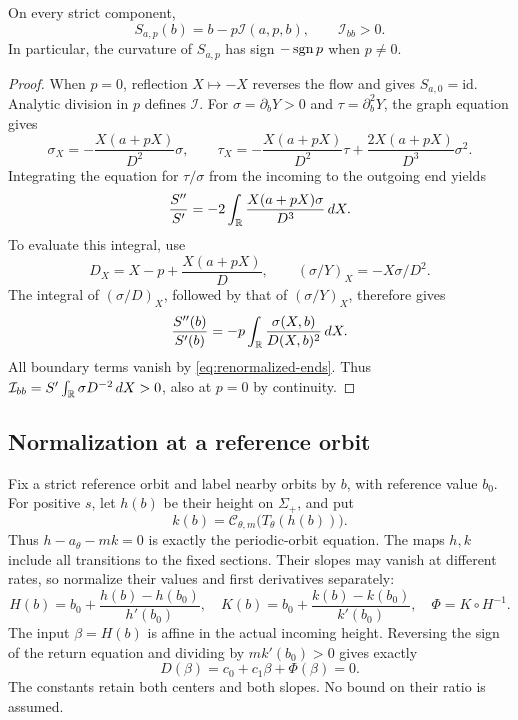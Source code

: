 \begin{proposition}\label{ann:prop-source-curvature}
On every strict component,
\begin{equation}\label{ann:source-scattering-division}
 S_{a,p}(b)=b-p\mathcal I(a,p,b),\qquad
 \mathcal I_{bb}>0.
\end{equation}
In particular, the curvature of \(S_{a,p}\) has sign
\(-\operatorname{sgn} p\) when \(p\ne0\).
\end{proposition}
\begin{proof}
When \(p=0\), reflection \(X\mapsto-X\) reverses the flow and gives
\(S_{a,0}=\mathrm{id}\). Analytic division in \(p\) defines \(\mathcal I\).
For \(\sigma=\partial_bY>0\) and \(\tau=\partial_b^2Y\), the graph
equation gives
\[
 \sigma_X=-\frac{X(a+pX)}{D^2}\sigma,\qquad
 \tau_X=-\frac{X(a+pX)}{D^2}\tau
              +\frac{2X(a+pX)}{D^3}\sigma^2.
\]
Integrating the equation for \(\tau/\sigma\) from the incoming to the
outgoing end yields
\[
 \frac{S''}{S'}=-2\int_\mathbb R\frac{X(a+pX)\sigma}{D^3}\,dX.
\]
To evaluate this integral, use
\[
 D_X=X-p+\frac{X(a+pX)}D,\qquad
 (\sigma/Y)_X=-X\sigma/D^2.
\]
The integral of \((\sigma/D)_X\), followed by that of
\((\sigma/Y)_X\), therefore gives
\begin{equation}\label{ann:source-log-curvature}
 \frac{S''(b)}{S'(b)}
       =-p\int_\mathbb R\frac{\sigma(X,b)}{D(X,b)^2}\,dX.
\end{equation}
All boundary terms vanish by \eqref{eq:renormalized-ends}.
Thus
\(\mathcal I_{bb}=S'\int_\mathbb R\sigma D^{-2}\,dX>0\), also at \(p=0\)
by continuity.
\end{proof}

\subsection{Normalization at a reference orbit}

Fix a strict reference orbit and label nearby orbits by \(b\), with
reference value \(b_0\). For positive \(s\), let \(h(b)\) be their
height on \(\Sigma_+\), and put
\[
 k(b)=\mathcal C_{\theta,m}\bigl(T_\theta(h(b))\bigr).
\]
Thus \(h-a_\theta-mk=0\) is exactly the periodic-orbit equation.
The maps \(h,k\) include all transitions to the fixed sections. Their
slopes may vanish at different rates, so normalize their values and first
derivatives separately:
\begin{equation}\label{eq:reference-normalization}
 H(b)=b_0+\frac{h(b)-h(b_0)}{h'(b_0)},\quad
 K(b)=b_0+\frac{k(b)-k(b_0)}{k'(b_0)},\quad
 \Phi=K\circ H^{-1}.
\end{equation}
The input \(\beta=H(b)\) is affine in the actual incoming height.
Reversing the sign of the return equation and dividing by \(mk'(b_0)>0\)
gives exactly
\begin{equation}\label{eq:affine-normalized-displacement}
 D(\beta)=c_0+c_1\beta+\Phi(\beta)=0 .
\end{equation}
The constants retain both centers and both slopes. No bound on their
ratio is assumed.

